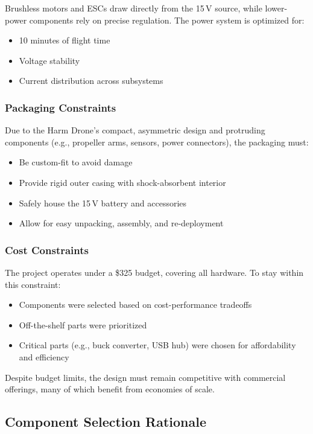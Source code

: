 \documentclass[12pt]{article}
\begin{document}
Brushless motors and ESCs draw directly from the 15\,V source, while lower-power components rely on precise regulation. The power system is optimized for:
\begin{itemize}
    \item 10 minutes of flight time
    \item Voltage stability
    \item Current distribution across subsystems
\end{itemize}

\subsubsection{Packaging Constraints}

Due to the Harm Drone’s compact, asymmetric design and protruding components (e.g., propeller arms, sensors, power connectors), the packaging must:
\begin{itemize}
    \item Be custom-fit to avoid damage
    \item Provide rigid outer casing with shock-absorbent interior
    \item Safely house the 15\,V battery and accessories
    \item Allow for easy unpacking, assembly, and re-deployment
\end{itemize}

\subsubsection{Cost Constraints}

The project operates under a \$325 budget, covering all hardware. To stay within this constraint:
\begin{itemize}
    \item Components were selected based on cost-performance tradeoffs
    \item Off-the-shelf parts were prioritized
    \item Critical parts (e.g., buck converter, USB hub) were chosen for affordability and efficiency
\end{itemize}

Despite budget limits, the design must remain competitive with commercial offerings, many of which benefit from economies of scale.

\subsection{Component Selection Rationale}
\end{document}
